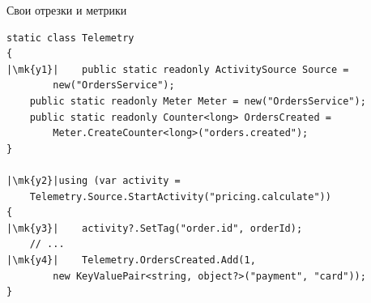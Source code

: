 \documentclass[aspectratio=169,10pt,t]{beamer}
\newcommand{\codexxs}{\ttfamily\fontsize{6.8}{7.8}\selectfont}
\newcommand{\mk}[1]{\tikz[remember picture,overlay]\coordinate (#1) at (0,0.55ex);}
\begin{document}
\begin{frame}[fragile]{Свои отрезки и метрики}
  \vspace{0.3em}
\begin{lstlisting}[style=csharp,basicstyle=\codexxs,escapechar=|]
static class Telemetry
{
|\mk{y1}|    public static readonly ActivitySource Source =
        new("OrdersService");
    public static readonly Meter Meter = new("OrdersService");
    public static readonly Counter<long> OrdersCreated =
        Meter.CreateCounter<long>("orders.created");
}

|\mk{y2}|using (var activity =
    Telemetry.Source.StartActivity("pricing.calculate"))
{
|\mk{y3}|    activity?.SetTag("order.id", orderId);
    // ...
|\mk{y4}|    Telemetry.OrdersCreated.Add(1,
        new KeyValuePair<string, object?>("payment", "card"));
}
\end{lstlisting}

\end{frame}

\begin{frame}[plain]
\end{frame}
\end{document}
